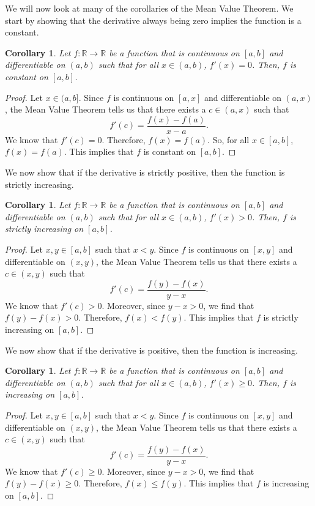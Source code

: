 \documentclass[a4paper, openany]{memoir}
\theoremstyle{definition}
\theoremstyle{plain}
\newtheorem{corollary}[definition]{Corollary}
\begin{document}
We will now look at many of the corollaries of the Mean Value Theorem. We start by showing that the derivative always being zero implies the function is a constant.
\begin{corollary}
Let $f: \mathbb{R} \to \mathbb{R}$ be a function that is continuous on $[a, b]$ and differentiable on $(a, b)$ such that for all $x \in (a, b)$, $f'(x) = 0$. Then, $f$ is constant on $[a, b]$.
\end{corollary}
\begin{proof}
Let $x \in (a, b]$. Since $f$ is continuous on $[a, x]$ and differentiable on $(a, x)$, the Mean Value Theorem tells us that there exists a $c \in (a, x)$ such that
\[f'(c) = \frac{f(x) - f(a)}{x - a}.\]
We know that $f'(c) = 0$. Therefore, $f(x) = f(a)$. So, for all $x \in [a, b]$, $f(x) = f(a)$. This implies that $f$ is constant on $[a, b]$.
\end{proof}
\noindent We now show that if the derivative is strictly positive, then the function is strictly increasing.
\begin{corollary}
Let $f: \mathbb{R} \to \mathbb{R}$ be a function that is continuous on $[a, b]$ and differentiable on $(a, b)$ such that for all $x \in (a, b)$, $f'(x) > 0$. Then, $f$ is strictly increasing on $[a, b]$.
\end{corollary}
\begin{proof}
Let $x, y \in [a, b]$ such that $x < y$. Since $f$ is continuous on $[x, y]$ and differentiable on $(x, y)$, the Mean Value Theorem tells us that there exists a $c \in (x, y)$ such that
\[f'(c) = \frac{f(y) - f(x)}{y - x}.\]
We know that $f'(c) > 0$. Moreover, since $y - x > 0$, we find that $f(y) - f(x) > 0$. Therefore, $f(x) < f(y)$. This implies that $f$ is strictly increasing on $[a, b]$.
\end{proof}
\noindent We now show that if the derivative is positive, then the function is increasing.
\begin{corollary}
Let $f: \mathbb{R} \to \mathbb{R}$ be a function that is continuous on $[a, b]$ and differentiable on $(a, b)$ such that for all $x \in (a, b)$, $f'(x) \geqslant 0$. Then, $f$ is increasing on $[a, b]$.
\end{corollary}
\begin{proof}
Let $x, y \in [a, b]$ such that $x < y$. Since $f$ is continuous on $[x, y]$ and differentiable on $(x, y)$, the Mean Value Theorem tells us that there exists a $c \in (x, y)$ such that
\[f'(c) = \frac{f(y) - f(x)}{y - x}.\]
We know that $f'(c) \geqslant 0$. Moreover, since $y - x > 0$, we find that $f(y) - f(x) \geqslant 0$. Therefore, $f(x) \leqslant f(y)$. This implies that $f$ is increasing on $[a, b]$.
\end{proof}
\end{document}
